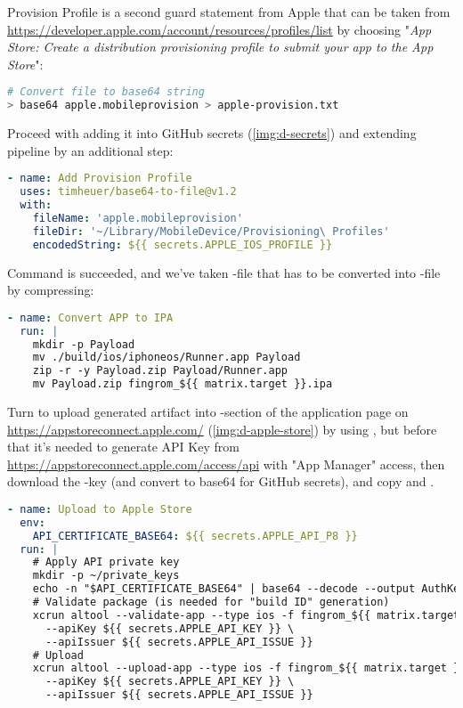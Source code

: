 Provision Profile is a second guard statement from Apple that can be taken from
\href{https://developer.apple.com/account/resources/profiles/list}{https://developer.apple.com/account/resources/profiles/list}
by choosing "\emph{App Store: Create a distribution provisioning profile to submit your app to the App Store}":

\begin{lstlisting}[language=bash]
# Convert file to base64 string
> base64 apple.mobileprovision > apple-provision.txt
\end{lstlisting}

\noindent Proceed with adding it into GitHub secrets (\cref{img:d-secrets}) and extending pipeline by an additional step:

\begin{lstlisting}[language=yaml]
- name: Add Provision Profile
  uses: timheuer/base64-to-file@v1.2
  with:
    fileName: 'apple.mobileprovision'
    fileDir: '~/Library/MobileDevice/Provisioning\ Profiles'
    encodedString: ${{ secrets.APPLE_IOS_PROFILE }}
\end{lstlisting}

\noindent Command  is succeeded, and we've taken -file that has to be 
converted into -file by compressing:

\begin{lstlisting}[language=yaml]
- name: Convert APP to IPA
  run: |
    mkdir -p Payload
    mv ./build/ios/iphoneos/Runner.app Payload
    zip -r -y Payload.zip Payload/Runner.app
    mv Payload.zip fingrom_${{ matrix.target }}.ipa
\end{lstlisting}


\noindent Turn to upload generated artifact into -section of the application page on 
\href{https://appstoreconnect.apple.com/}{https://appstoreconnect.apple.com/} (\cref{img:d-apple-store}) by using 
, but before that it's needed to generate API Key from 
\href{https://appstoreconnect.apple.com/access/api}{https://appstoreconnect.apple.com/access/api} with "App Manager"
access, then download the -key (and convert to base64 for GitHub secrets), and copy  and .

\begin{lstlisting}[language=yaml]
- name: Upload to Apple Store
  env:
    API_CERTIFICATE_BASE64: ${{ secrets.APPLE_API_P8 }}
  run: |
    # Apply API private key
    mkdir -p ~/private_keys
    echo -n "$API_CERTIFICATE_BASE64" | base64 --decode --output AuthKey_${{ secrets.APPLE_API_KEY }}.p8
    # Validate package (is needed for "build ID" generation)
    xcrun altool --validate-app --type ios -f fingrom_${{ matrix.target }}.ipa \ 
      --apiKey ${{ secrets.APPLE_API_KEY }} \
      --apiIssuer ${{ secrets.APPLE_API_ISSUE }}
    # Upload
    xcrun altool --upload-app --type ios -f fingrom_${{ matrix.target }}.ipa \
      --apiKey ${{ secrets.APPLE_API_KEY }} \
      --apiIssuer ${{ secrets.APPLE_API_ISSUE }}
\end{lstlisting}

